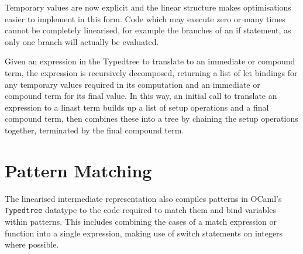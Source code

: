%

Temporary values are now explicit and the linear structure makes optimisations easier to implement in this form. Code which may execute zero or many times cannot be completely linearised, for example the branches of an if statement, as only one branch will actually be evaluated. 

Given an expression in the Typedtree to translate to an immediate or compound term, the expression is recursively decomposed, returning a list of let bindings for any temporary values required in its computation and an immediate or compound term for its final value. In this way, an initial call to translate an expression to a linast term builds up a list of setup operations and a final compound term, then combines these into a tree by chaining the setup operations together, terminated by the final compound term.




\section{Pattern Matching}
The linearised intermediate representation also compiles patterns in OCaml's \verb|Typedtree| datatype to the code required to match them and bind variables within patterns. This includes combining the cases of a match expression or function into a single expression, making use of switch statements on integers where possible. 


